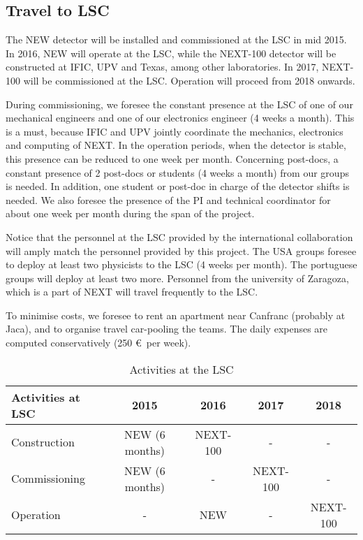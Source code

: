 \subsection{Travel to LSC}
The NEW detector will be installed and commissioned at the LSC in mid 2015. In 2016, NEW will operate at the LSC, while the NEXT-100 detector will be constructed at IFIC, UPV and Texas, among other laboratories. In 2017, NEXT-100 will be commissioned at the LSC. Operation will proceed from 2018 onwards.

During commissioning, we foresee the constant presence at the LSC of one of our mechanical engineers and one of our electronics engineer (4 weeks a month).  This is a must, because IFIC and UPV jointly coordinate the mechanics, electronics and computing of NEXT. In the operation periods, when the detector is stable, this presence can be reduced to one week per month. Concerning post-docs, a constant presence of 2 post-docs or students (4 weeks a month) from our groups is needed. In addition, one student or post-doc in charge of the detector shifts is needed. We also foresee the presence of the PI and technical coordinator for about one week per month during the span of the project. 

Notice that the personnel at the LSC provided by the international collaboration will amply match the personnel provided by this project. The USA groups foresee to deploy at least two physicists to the LSC (4 weeks per month). The portuguese groups will deploy at least two more. Personnel from the university of Zaragoza, which is a part of NEXT will travel frequently to the LSC. 

To minimise costs, we foresee to rent an apartment near Canfranc (probably at Jaca), and to organise travel car-pooling the teams. The daily expenses are computed conservatively (250 \euro\ per week). 

\begin{table}[h!]
\begin{center}
\begin{tabular}{|l|c|c|c|c|}
\hline
Activities at LSC &	2015 &	2016 &	2017 &	2018\\
 \hline	
Construction &	NEW (6 months) &	NEXT-100 & - & - \\ 		
Commissioning	&NEW (6 months) &	- & NEXT-100 & - \\	
Operation	&	- &  NEW & - & NEXT-100 \\ 		
\end{tabular}  
\caption{Activities at the LSC}
\label{tab.ActivitiesLSC}
\end{center}
\end{table}
 
